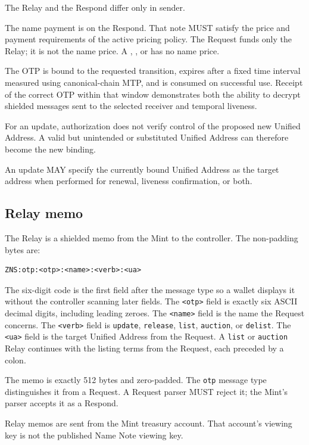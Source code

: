 The Relay and the Respond differ only in sender.

The name payment is on the Respond. That note MUST satisfy the price and payment requirements of the active pricing policy. The Request funds only the Relay; it is not the name price. A , , or  has no name price.

The OTP is bound to the requested transition, expires after a fixed time interval measured using canonical-chain MTP, and is consumed on successful use. Receipt of the correct OTP within that window demonstrates both the ability to decrypt shielded messages sent to the selected receiver and temporal liveness.

For an update, authorization does not verify control of the proposed new Unified Address. A valid but unintended or substituted Unified Address can therefore become the new binding.

An update MAY specify the currently bound Unified Address as the target address when performed for renewal, liveness confirmation, or both.

\subsection{Relay memo}

The Relay is a shielded memo from the Mint to the controller. The non-padding bytes are:

\begin{verbatim}
ZNS:otp:<otp>:<name>:<verb>:<ua>
\end{verbatim}

The six-digit code is the first field after the message type so a wallet displays it without the controller scanning later fields. The \texttt{<otp>} field is exactly six ASCII decimal digits, including leading zeroes. The \texttt{<name>} field is the name the Request concerns. The \texttt{<verb>} field is \texttt{update}, \texttt{release}, \texttt{list}, \texttt{auction}, or \texttt{delist}. The \texttt{<ua>} field is the target Unified Address from the Request. A \texttt{list} or \texttt{auction} Relay continues with the listing terms from the Request, each preceded by a colon.

The memo is exactly 512 bytes and zero-padded. The \texttt{otp} message type distinguishes it from a Request. A Request parser MUST reject it; the Mint's parser accepts it as a Respond.

Relay memos are sent from the Mint treasury account. That account's viewing key is not the published Name Note viewing key.

